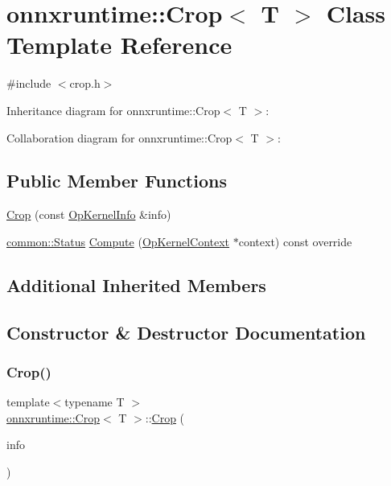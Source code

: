 \hypertarget{classonnxruntime_1_1Crop}{}\section{onnxruntime\+:\+:Crop$<$ T $>$ Class Template Reference}
\label{classonnxruntime_1_1Crop}


{\ttfamily \#include $<$crop.\+h$>$}



Inheritance diagram for onnxruntime\+:\+:Crop$<$ T $>$\+:


Collaboration diagram for onnxruntime\+:\+:Crop$<$ T $>$\+:
\subsection*{Public Member Functions}
\begin{DoxyCompactItemize}
\item 
\mbox{\hyperlink{classonnxruntime_1_1Crop_a7dcf70f2ad4c78e5d955222a77b5b69c}{Crop}} (const \mbox{\hyperlink{classonnxruntime_1_1OpKernelInfo}{Op\+Kernel\+Info}} \&info)
\item 
\mbox{\hyperlink{classonnxruntime_1_1common_1_1Status}{common\+::\+Status}} \mbox{\hyperlink{classonnxruntime_1_1Crop_aab20aca15fa7501ee25794b662c47f14}{Compute}} (\mbox{\hyperlink{classonnxruntime_1_1OpKernelContext}{Op\+Kernel\+Context}} $\ast$context) const override
\end{DoxyCompactItemize}
\subsection*{Additional Inherited Members}


\subsection{Constructor \& Destructor Documentation}
\mbox{\label{classonnxruntime_1_1Crop_a7dcf70f2ad4c78e5d955222a77b5b69c}} 
\subsubsection{\texorpdfstring{Crop()}{Crop()}}
{\footnotesize\ttfamily template$<$typename T $>$ \\
\mbox{\hyperlink{classonnxruntime_1_1Crop}{onnxruntime\+::\+Crop}}$<$ T $>$\+::\mbox{\hyperlink{classonnxruntime_1_1Crop}{Crop}} (\begin{DoxyParamCaption}\item[{const \mbox{\hyperlink{classonnxruntime_1_1OpKernelInfo}{Op\+Kernel\+Info}} \&}]{info }\end{DoxyParamCaption})\hspace{0.3cm}{\ttfamily [inline]}}



